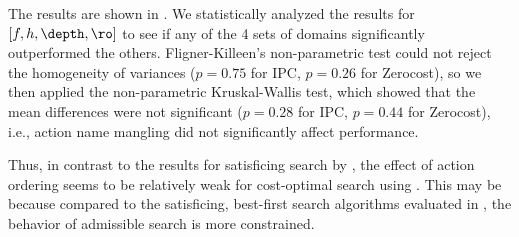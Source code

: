 The results are shown in .
We statistically analyzed the results for $[f,h,\depth,\ro]$ 
to see if any of the 4 sets of domains
significantly outperformed the others.
Fligner-Killeen's non-parametric test could not reject the homogeneity of variances
($p=0.75$ for IPC, $p=0.26$ for Zerocost), so
we then applied the non-parametric Kruskal-Wallis test,
which showed that the mean differences were not significant
($p=0.28$ for IPC, $p=0.44$ for Zerocost),
i.e., action name mangling did not significantly affect performance.

Thus, in contrast to the results for satisficing search by \cite{vallati2015effective}, 
the effect of action ordering  seems to be relatively weak for cost-optimal search using \astar.
This may be because 
compared to the satisficing, best-first search algorithms evaluated in \cite{vallati2015effective},
the behavior of admissible search is more constrained.



